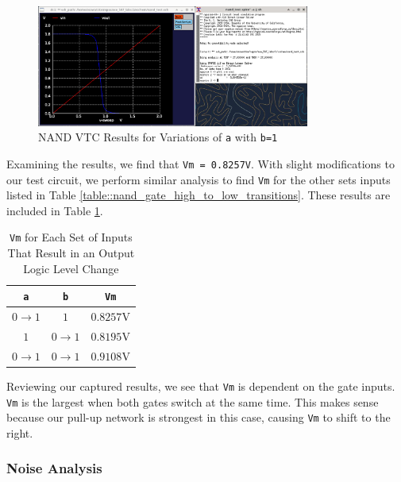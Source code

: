 \documentclass[fleqn]{article}
\begin{document}
	\begin{figure}[H]
		\centerline{\includegraphics[width=0.8\textwidth]{nand_vtc_sweep_va.png}}
		\caption{NAND VTC Results for Variations of \texttt{a} with \texttt{b=1}}
		\label{fig::nand_vtc_sweep_va}
	\end{figure}
	
	Examining the results, we find that \texttt{Vm = 0.8257V}. With slight modifications to our test circuit, we perform similar analysis to find \texttt{Vm} for the other sets inputs listed in Table \ref{table::nand_gate_high_to_low_transitions}. These results are included in Table \ref{table::nand_gate_vm}.
	
	\begin{table}[H]
	\begin{center}
	\caption{\texttt{Vm} for Each Set of Inputs That Result in an Output Logic Level Change}
	\label{table::nand_gate_vm}
	\begin{tabular}{| c | c | c |}
		\hline
		\texttt{a} & \texttt{b} & \texttt{Vm}\\
		\hline	
		$0 \rightarrow 1$ & $1$ & $0.8257 \text{V}$\\
		\hline	
		$1$ & $0 \rightarrow 1$ & $0.8195 \text{V}$\\
		\hline	
		$0 \rightarrow 1$ & $0 \rightarrow 1$ & $0.9108 \text{V}$\\
		\hline
	\end{tabular}
	\end{center}
	\end{table}
	
	\noindent Reviewing our captured results, we see that \texttt{Vm} is dependent on the gate inputs. \texttt{Vm} is the largest when both gates switch at the same time. This makes sense because our pull-up network is strongest in this case, causing \texttt{Vm} to shift to the right.
	
	\subsubsection{Noise Analysis}
	\label{section::nand_noise_analysis}
	
\end{document}
